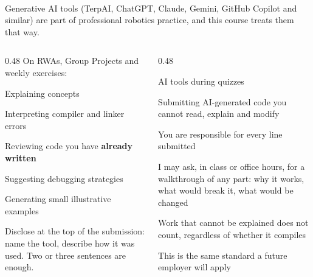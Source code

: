 \documentclass[
    10pt,
    dvipsnames,
    svgnames,
    x11names,
    aspectratio=1610,
    english,
    codeminted]{beamer}
\begin{document}
\begin{frame}[fragile]{\secname}
\framesubtitle{\subsecname}
Generative AI tools (TerpAI, ChatGPT, Claude, Gemini, GitHub Copilot and similar) are part of professional robotics practice, and this course treats them that way.

\begin{columns}[T,onlytextwidth]
\begin{column}{0.48\textwidth}
On RWAs, Group Projects and weekly exercises:
\begin{compactitem}
\small
    \item Explaining concepts
    \item Interpreting compiler and linker errors
    \item Reviewing code you have \textbf{already written}
    \item Suggesting debugging strategies
    \item Generating small illustrative examples
\end{compactitem}
\smallskip
Disclose at the top of the submission: name the tool, describe how it was used. Two or three sentences are enough.
\end{column}
\begin{column}{0.48\textwidth}
\begin{compactitem}
\scriptsize
    \item AI tools during quizzes
    \item Submitting AI-generated code you cannot read, explain and modify
\end{compactitem}

\medskip
{}
\begin{compactitem}
\scriptsize
    \item You are responsible for every line submitted
    \item I may ask, in class or office hours, for a walkthrough of any part: why it works, what would break it, what would be changed
    \item Work that cannot be explained does not count, regardless of whether it compiles
    \item This is the same standard a future employer will apply
\end{compactitem}
\end{column}
\end{columns}

\end{frame}
\end{document}
